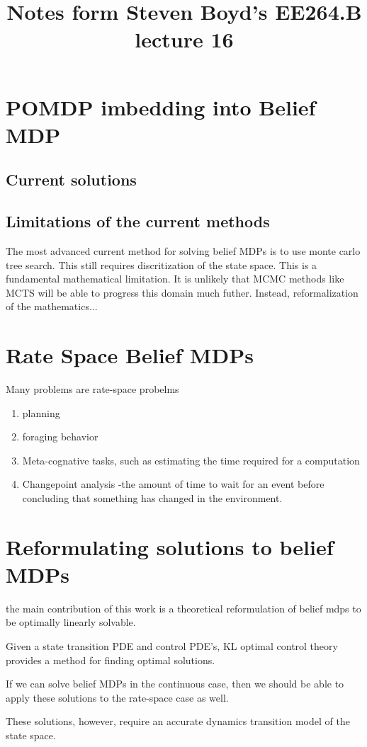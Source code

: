\documentclass[11pt]{article}
\title{Notes form Steven Boyd's EE264.B lecture 16}
\begin{document}
\section{POMDP imbedding into Belief MDP}
\subsection{Current solutions}
\subsection{Limitations of the current methods}
The most advanced current method for solving belief MDPs is to use monte carlo tree search.
This still requires discritization of the state space. This is a fundamental mathematical
limitation. It is unlikely that MCMC methods like MCTS will be able to progress this
domain much futher. Instead, reformalization of the mathematics...

\section{Rate Space Belief MDPs}
Many problems are rate-space probelms
\begin{enumerate}
\item planning
\item foraging behavior
\item Meta-cognative tasks, such as estimating the time required for a computation
\item Changepoint analysis -the amount of time to wait for an event before concluding
  that something has changed in the environment.
\end{enumerate}


\section{Reformulating solutions to belief MDPs}
the main contribution of this work is a theoretical reformulation of belief
mdps to be optimally linearly solvable.

Given a state transition PDE and control PDE's, KL optimal control theory provides
a method for finding optimal solutions.

If we can solve belief MDPs in the continuous case, then we should be able to apply
these solutions to the rate-space case as well.

These solutions, however, require an accurate dynamics transition model of the state
space.
\end{document}
